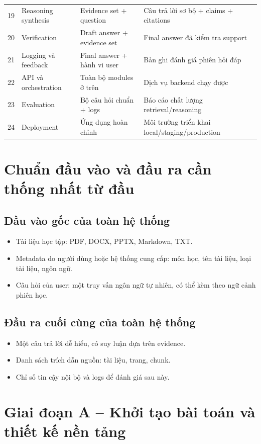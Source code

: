 \documentclass[12pt,a4paper]{article}
\begin{document}
\begin{longtable}{p{}p{}p{}p{}}
19 & Reasoning synthesis & Evidence set + question & Câu trả lời sơ bộ + claims + citations \\
20 & Verification & Draft answer + evidence set & Final answer đã kiểm tra support \\
21 & Logging và feedback & Final answer + hành vi user & Bản ghi đánh giá phiên hỏi đáp \\
22 & API và orchestration & Toàn bộ modules ở trên & Dịch vụ backend chạy được \\
23 & Evaluation & Bộ câu hỏi chuẩn + logs & Báo cáo chất lượng retrieval/reasoning \\
24 & Deployment & Ứng dụng hoàn chỉnh & Môi trường triển khai local/staging/production \\
\bottomrule
\end{longtable}

\section{Chuẩn đầu vào và đầu ra cần thống nhất từ đầu}

\subsection{Đầu vào gốc của toàn hệ thống}
\begin{itemize}
    \item Tài liệu học tập: PDF, DOCX, PPTX, Markdown, TXT.
    \item Metadata do người dùng hoặc hệ thống cung cấp: môn học, tên tài liệu, loại tài liệu, ngôn ngữ.
    \item Câu hỏi của user: một truy vấn ngôn ngữ tự nhiên, có thể kèm theo ngữ cảnh phiên học.
\end{itemize}

\subsection{Đầu ra cuối cùng của toàn hệ thống}
\begin{itemize}
    \item Một câu trả lời dễ hiểu, có suy luận dựa trên evidence.
    \item Danh sách trích dẫn nguồn: tài liệu, trang, chunk.
    \item Chỉ số tin cậy nội bộ và logs để đánh giá sau này.
\end{itemize}

\section{Giai đoạn A -- Khởi tạo bài toán và thiết kế nền tảng}
\end{document}
